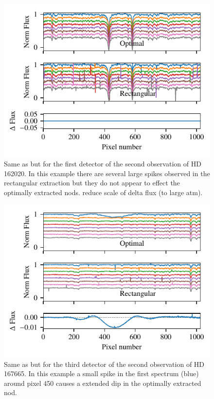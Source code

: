  \begin{figure}
     \centering
     \includegraphics[width=0.7\linewidth]{figures/appendix/bp_plots/extraction_comparision_HD162020-2_chip_1}
     \caption{Same as  but for the first detector of the second observation of {HD\,162020}. In this example there are several large spikes observed in the rectangular extraction but they do not appear to effect the optimally extracted nods. {\red{} reduce scale of delta flux (to large atm)}.}
     \label{fig:artefact_example2}
 \end{figure}
 \begin{figure}
     \centering
     \includegraphics[width=0.7\linewidth]{figures/appendix/bp_plots/extraction_comparision_HD167665-1b_chip_3}
     \caption{Same as  but for the third detector of the second observation of {HD\,167665}. In this example a small spike in the first spectrum (blue) around pixel 450 causes a extended dip in the optimally extracted nod.}
     \label{fig:artefact_example3}
 \end{figure}
